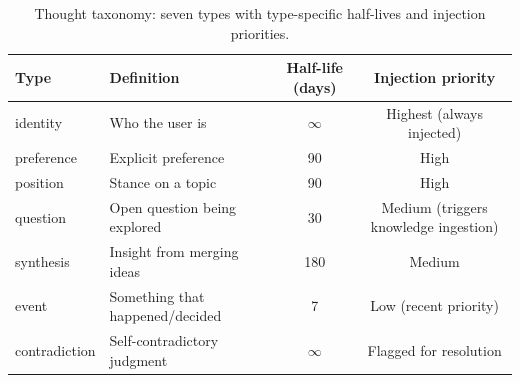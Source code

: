 \begin{table}[ht]
\centering
\caption{Thought taxonomy: seven types with type-specific half-lives and injection priorities.}
\label{tab:thought_types}
\begin{tabular}{llcc}
\toprule
\textbf{Type} & \textbf{Definition} & \textbf{Half-life (days)} & \textbf{Injection priority} \\
\midrule
identity       & Who the user is               & $\infty$ & Highest (always injected) \\
preference     & Explicit preference           & 90       & High \\
position       & Stance on a topic             & 90       & High \\
question       & Open question being explored   & 30       & Medium (triggers knowledge ingestion) \\
synthesis      & Insight from merging ideas    & 180      & Medium \\
event          & Something that happened/decided & 7        & Low (recent priority) \\
contradiction  & Self-contradictory judgment   & $\infty$ & Flagged for resolution \\
\bottomrule
\end{tabular}
\end{table}